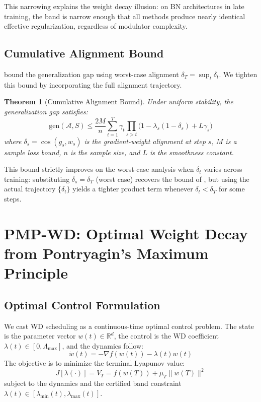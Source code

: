 \documentclass{article}
\newtheorem{theorem}{Theorem}
\begin{document}
This narrowing explains the weight decay illusion: on BN architectures in late training, the band is narrow enough that all methods produce nearly identical effective regularization, regardless of modulator complexity.

\subsection{Cumulative Alignment Bound}

\citet{sun2025wd_generalization} bound the generalization gap using worst-case alignment $\delta_T = \sup_t \delta_t$. We tighten this bound by incorporating the full alignment trajectory.

\begin{theorem}[Cumulative Alignment Bound]
\label{thm:alignment}
Under uniform stability, the generalization gap satisfies:
\begin{equation}
\text{gen}(\mathcal{A}, S) \leq \frac{2M}{n} \sum_{t=1}^{T} \gamma_t \prod_{s > t} \bigl(1 - \lambda_s(1 - \delta_s) + L\gamma_s\bigr)
\label{eq:alignment_bound}
\end{equation}
where $\delta_s = \cos(g_s, w_s)$ is the gradient-weight alignment at step $s$, $M$ is a sample loss bound, $n$ is the sample size, and $L$ is the smoothness constant.
\end{theorem}

This bound strictly improves on the worst-case analysis when $\delta_t$ varies across training: substituting $\delta_s = \delta_T$ (worst case) recovers the bound of \citet{sun2025wd_generalization}, but using the actual trajectory $\{\delta_t\}$ yields a tighter product term whenever $\delta_t < \delta_T$ for some steps.

\section{PMP-WD: Optimal Weight Decay from Pontryagin's Maximum Principle}
\label{sec:pmpwd}

\subsection{Optimal Control Formulation}

We cast WD scheduling as a continuous-time optimal control problem. The state is the parameter vector $w(t) \in \mathbb{R}^d$, the control is the WD coefficient $\lambda(t) \in [0, \Lambda_{\max}]$, and the dynamics follow:
\begin{equation}
\dot{w}(t) = -\nabla f(w(t)) - \lambda(t) w(t)
\label{eq:dynamics}
\end{equation}
The objective is to minimize the terminal Lyapunov value:
\begin{equation}
J[\lambda(\cdot)] = V_T = f(w(T)) + \mu_T \|w(T)\|^2
\label{eq:objective}
\end{equation}
subject to the dynamics and the certified band constraint $\lambda(t) \in [\lambda_{\min}(t), \lambda_{\max}(t)]$.
\end{document}
